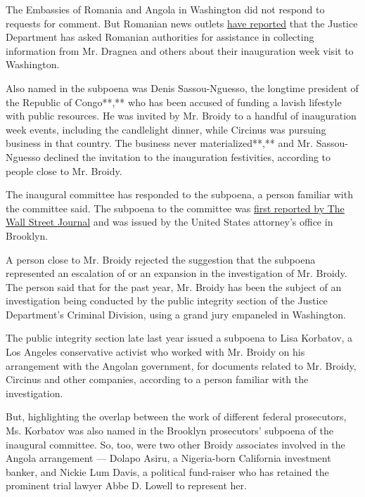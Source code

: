The Embassies of Romania and Angola in Washington did not respond to
requests for comment. But Romanian news outlets
\href{https://www.g4media.ro/exclusiv-vizita-lui-dragnea-si-grindeanu-in-america-la-ceremonia-de-inaugurare-a-presedintelui-trump-in-atentia-anchetatorilor-americani-plus-legatura-dintre-elliot-broidy-si-cristian-burci.html}{have
reported} that the Justice Department has asked Romanian authorities for
assistance in collecting information from Mr. Dragnea and others about
their inauguration week visit to Washington.

Also named in the subpoena was Denis Sassou-Nguesso, the longtime
president of the Republic of Congo**,** who has been accused of funding
a lavish lifestyle with public resources. He was invited by Mr. Broidy
to a handful of inauguration week events, including the candlelight
dinner, while Circinus was pursuing business in that country. The
business never materialized**,** and Mr. Sassou-Nguesso declined the
invitation to the inauguration festivities, according to people close to
Mr. Broidy.

The inaugural committee has responded to the subpoena, a person familiar
with the committee said. The subpoena to the committee was
\href{https://www.wsj.com/articles/prosecutors-intensify-scrutiny-of-trump-fundraiser-elliott-broidy-11561109521}{first
reported by The Wall Street Journal} and was issued by the United States
attorney's office in Brooklyn.

A person close to Mr. Broidy rejected the suggestion that the subpoena
represented an escalation of or an expansion in the investigation of Mr.
Broidy. The person said that for the past year, Mr. Broidy has been the
subject of an investigation being conducted by the public integrity
section of the Justice Department's Criminal Division, using a grand
jury empaneled in Washington.

The public integrity section late last year issued a subpoena to Lisa
Korbatov, a Los Angeles conservative activist who worked with Mr. Broidy
on his arrangement with the Angolan government, for documents related to
Mr. Broidy, Circinus and other companies, according to a person familiar
with the investigation.

But, highlighting the overlap between the work of different federal
prosecutors, Ms. Korbatov was also named in the Brooklyn prosecutors'
subpoena of the inaugural committee. So, too, were two other Broidy
associates involved in the Angola arrangement --- Dolapo Asiru, a
Nigeria-born California investment banker, and Nickie Lum Davis, a
political fund-raiser who has retained the prominent trial lawyer Abbe
D. Lowell to represent her.


